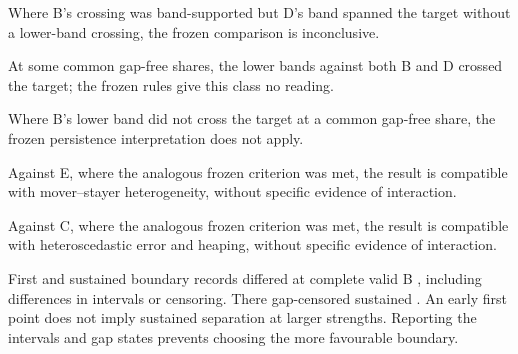 Where B's crossing was band-supported but D's band spanned the target without a lower-band crossing, the frozen comparison is inconclusive. %

At some common gap-free shares, the lower bands against both B and D crossed the target; the frozen rules give this class no reading. %

Where B's lower band did not cross the target at a common gap-free share, the frozen persistence interpretation does not apply. %

Against E, where the analogous frozen criterion was met, the result is compatible with mover--stayer heterogeneity, without specific evidence of interaction. %

Against C, where the analogous frozen criterion was met, the result is compatible with heteroscedastic error and heaping, without specific evidence of interaction. %

First and sustained boundary records differed at  complete valid B , including differences in intervals or censoring. There   gap-censored sustained . %
An early first point does not imply sustained separation at larger strengths. Reporting the intervals and gap states prevents choosing the more favourable boundary. %

